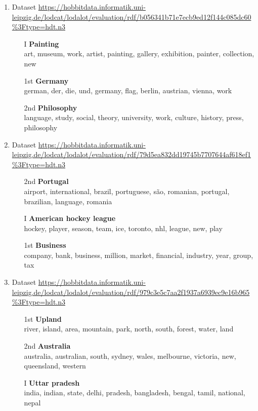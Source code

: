 \begin{enumerate}
\item Dataset \url{https://hobbitdata.informatik.uni-leipzig.de/lodcat/lodalot/evaluation/rdf/b056341b71e7ecb9ed12f144c085dc60%3Ftype=hdt.n3}
\begin{itemize}
\item[I] \textbf{Painting}\\
art, museum,
work, artist, painting, gallery, exhibition, painter, collection, new
\item[1st] \textbf{Germany}\\
german, der, die, und, germany,
flag, berlin, austrian, vienna, work
\item[2nd] \textbf{Philosophy}\\
language, study, social, theory, university, work, culture,
history, press, philosophy
\end{itemize}
\vspace{1cm}

\item Dataset \url{https://hobbitdata.informatik.uni-leipzig.de/lodcat/lodalot/evaluation/rdf/79d5ea832dd19745b7707644af618ef1%3Ftype=hdt.n3}
\begin{itemize}
\item[2nd] \textbf{Portugal}\\
airport,
international, brazil, portuguese, são, romanian, portugal, brazilian, language, romania
\item[I] \textbf{American hockey league}\\
hockey, player, season, team, ice, toronto, nhl, league, new, play
\item[1st] \textbf{Business}\\
company, bank,
business, million, market, financial, industry, year, group, tax
\end{itemize}
\vspace{1cm}

\item Dataset \url{https://hobbitdata.informatik.uni-leipzig.de/lodcat/lodalot/evaluation/rdf/979c3e5c7aa2f1937a6939ec9e16b965%3Ftype=hdt.n3}
\begin{itemize}
\item[1st] \textbf{Upland}\\
river, island,
area, mountain, park, north, south, forest, water, land
\item[2nd] \textbf{Australia}\\
australia, australian, south, sydney, wales,
melbourne, victoria, new, queensland, western
\item[I] \textbf{Uttar pradesh}\\
india, indian, state, delhi, pradesh,
bangladesh, bengal, tamil, national, nepal
\end{itemize}
\end{enumerate}

